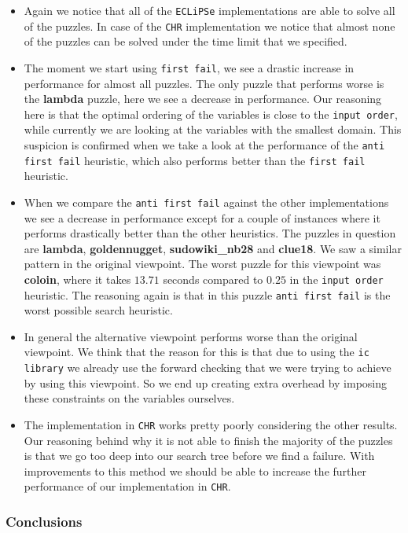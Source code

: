 \begin{itemize}
\item Again we notice that all of the \texttt{ECLiPSe} implementations are able to solve all of the puzzles. In case of the \texttt{CHR} implementation we notice that almost none of the puzzles can be solved under the time limit that we specified.
\item The moment we start using \texttt{first fail}, we see a drastic increase in performance for almost all puzzles. The only puzzle that performs worse is the \textbf{lambda} puzzle, here we see a decrease in performance. Our reasoning here is that the optimal ordering of the variables is close to the \texttt{input order}, while currently we are looking at the variables with the smallest domain. This suspicion is confirmed when we take a look at the performance of the \texttt{anti first fail} heuristic, which also performs better than the \texttt{first fail} heuristic.
\item When we compare the \texttt{anti first fail} against the other implementations we see a decrease in performance except for a couple of instances where it performs drastically better than the other heuristics. The puzzles in question are \textbf{lambda}, \textbf{goldennugget}, \textbf{sudowiki\_nb28} and \textbf{clue18}. We saw a similar pattern in the original viewpoint. The worst puzzle for this viewpoint was \textbf{coloin}, where it takes $13.71$ seconds compared to $0.25$ in the \texttt{input order} heuristic. The reasoning again is that in this puzzle \texttt{anti first fail} is the worst possible search heuristic.
\item In general the alternative viewpoint performs worse than the original viewpoint. We think that the reason for this is that due to using the \texttt{ic library} we already use the forward checking that we were trying to achieve by using this viewpoint. So we end up creating extra overhead by imposing these constraints on the variables ourselves. 
\item The implementation in \texttt{CHR} works pretty poorly considering the other results. Our reasoning behind why it is not able to finish the majority of the puzzles is that we go too deep into our search tree before we find a failure. With improvements to this method we should be able to increase the further performance of our implementation in \texttt{CHR}.
\end{itemize}

\subsubsection{Conclusions}

